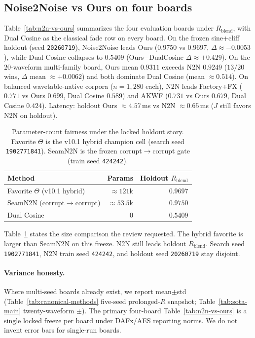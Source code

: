 \subsection{Noise2Noise vs Ours on four boards}
\label{sec:n2n-vs-ours-boards}
Table~\ref{tab:n2n-vs-ours} summarizes the four evaluation boards under $R_{\mathrm{blend}}$,
with Dual Cosine as the classical fade row on every board.
On the frozen sine{+}cliff holdout (seed \texttt{20260719}), Noise2Noise leads Ours
($0.9750$ vs $0.9697$, $\Delta{\approx}{-}0.0053$), while Dual Cosine collapses to $0.5409$
(Ours$-$DualCosine $\Delta{\approx}{+}0.429$).
On the $20$-waveform multi-family board, Ours mean $0.9311$ exceeds N2N $0.9249$
($13/20$ wins, $\Delta$ mean ${\approx}{+}0.0062$) and both dominate Dual Cosine (mean ${\approx}0.514$).
On balanced wavetable-native corpora ($n{=}1{,}280$ each), N2N leads Factory+FX
($0.771$ vs Ours $0.699$, Dual Cosine $0.589$) and AKWF
($0.731$ vs Ours $0.679$, Dual Cosine $0.424$).
Latency: holdout Ours ${\approx}4.57$\,ms vs N2N ${\approx}0.65$\,ms ($J$ still favors N2N on holdout).

\begin{table}[t]
  \centering
  \caption{Parameter-count fairness under the locked holdout story.
    Favorite $\Theta$ is the v10.1 hybrid champion cell (search seed \texttt{1902771841}).
    SeamN2N is the frozen corrupt$\to$corrupt gate (train seed \texttt{424242}).}
  \label{tab:param-fairness}
  \setlength{\tabcolsep}{4pt}
  \begin{tabular}{@{}lrr@{}}
    \toprule
    Method & Params & Holdout $R_{\mathrm{blend}}$ \\
    \midrule
    Favorite $\Theta$ (v10.1 hybrid) & ${\approx}121$k & $0.9697$ \\
    SeamN2N (corrupt$\to$corrupt) & ${\approx}53.5$k & $0.9750$ \\
    Dual Cosine & $0$ & $0.5409$ \\
    \bottomrule
  \end{tabular}
\end{table}

\noindent
Table~\ref{tab:param-fairness} states the size comparison the review requested.
The hybrid favorite is larger than SeamN2N on this freeze.
N2N still leads holdout $R_{\mathrm{blend}}$.
Search seed \texttt{1902771841}, N2N train seed \texttt{424242}, and holdout seed \texttt{20260719} stay disjoint.

\paragraph{Variance honesty.}
Where multi-seed boards already exist, we report mean$\pm$std
(Table~\ref{tab:canonical-methods} five-seed prolonged-$R$ snapshot; Table~\ref{tab:sota-main} twenty-waveform $\pm$).
The primary four-board Table~\ref{tab:n2n-vs-ours} is a single locked freeze per board under DAFx/AES reporting norms.
We do not invent error bars for single-run boards.

